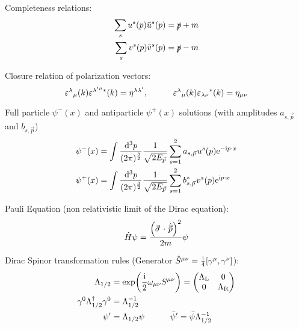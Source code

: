 			\noindent
			Completeness relations:
			\begin{equation}
				\begin{aligned}
					\sum_s u^s(p) \bar{u}^s(p) &= \slashed{p} + m \\
					\sum_s v^s(p) \bar{v}^s(p) &= \slashed{p} - m
				\end{aligned}
			\end{equation}

			\noindent
			Closure relation of polarization vectors:
			\begin{equation}
				\varepsilon^{\lambda}{}_{\mu}(k)\varepsilon^{\lambda^{\prime}{}^{\mu}\ast}(k)=\eta^{\lambda\lambda^{\prime}},
				\hspace{30pt}
				\varepsilon^{\lambda}{}_{\mu}(k)\varepsilon_{\lambda\nu}{}^{\ast}(k)=\eta_{\mu\nu}
			\end{equation}
			
			\noindent
			Full particle $\psi^{-}(x)$ and antiparticle $\psi^{+}(x)$ solutions (with amplitudes $a_{s,\vec{p}}$ and $b_{s,\vec{p}}$)
			\begin{equation}
				\begin{aligned}
					\psi^{-}(x) &= \int\frac{\dd^{3}p}{(2\pi)^{\frac{3}{2}}}\frac{1}{\sqrt{2E_{\vec{p}}}}\sum_{s=1}^{2}a_{s, \vec{p}}u^{s}(p)\ex^{-\i p\cdot x} \\
					\psi^{+}(x) &= \int\frac{\dd^{3}p}{(2\pi)^{\frac{3}{2}}}\frac{1}{\sqrt{2E_{\vec{p}}}}\sum_{s=1}^{2}{b_{s, \vec{p}}^{*}}v^{s}(p)\ex^{\i p\cdot x}
				\end{aligned}
			\end{equation}

			\noindent
			Pauli Equation (non relativistic limit of the Dirac equation):
			\begin{equation}
				\hat{H}\psi = \frac{\qty(\vec{\sigma}\cdot\hat{\vec{p}})^2}{2m} \psi
			\end{equation}
	
			\noindent
			Dirac Spinor transformation rules (Generator $\hat{S}^{\mu\nu} = \frac{\mathrm{i}}{4}[\gamma^\mu,\gamma^\nu]$):
			\begin{equation}
				\begin{aligned}
					\Lambda_{1/2} &= \exp(\frac{\i}{2}\omega_{\mu\nu}S^{\mu\nu}) = \mqty(\Lambda_\text{L} & 0 \\ 0 & \Lambda_\text{R}) \\
					\gamma^0 \Lambda_{1/2}^\dagger \gamma^0	&= \Lambda_{1/2}^{-1} \\
					\psi' &= \Lambda_{1/2} \psi 
					\hsp \bar{\psi}' = \bar{\psi} \Lambda_{1/2}^{-1} 
				\end{aligned}
			\end{equation}

